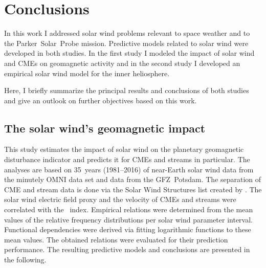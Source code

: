 
\chapter{Conclusions}
\label{chap:summary}

In this work I addressed solar wind problems relevant to space weather and to the Parker~Solar~Probe mission. Predictive models related to solar wind were developed in both studies. In the first study I modeled the impact of solar wind and CMEs on geomagnetic activity and in the second study I developed an empirical solar wind model for the inner heliosphere.

Here, I briefly summarize the principal results and conclusions of both studies and give an outlook on further objectives based on this work.

\section{The solar wind's geomagnetic impact}
This study estimates the impact of solar wind on the planetary geomagnetic disturbance indicator \Kp{} and predicts it for CMEs and streams in particular.
The analyses are based on 35~years (1981--2016) of near-Earth solar wind data from the minutely OMNI data set and \Kp{} data from the GFZ~Potsdam. The separation of CME and stream data is done via the Solar Wind Structures list created by \citet{Richardson2000}.
The solar wind electric field proxy \vBz{} and the velocity of CMEs and streams were correlated with the \Kp~index. Empirical relations were determined from the mean values of the relative \Kp{} frequency distributions per solar wind parameter interval. Functional dependencies were derived via fitting logarithmic functions to these mean \Kp{} values.
The obtained \Kp{} relations were evaluated for their prediction performance. The resulting predictive models and conclusions are presented in the following.

